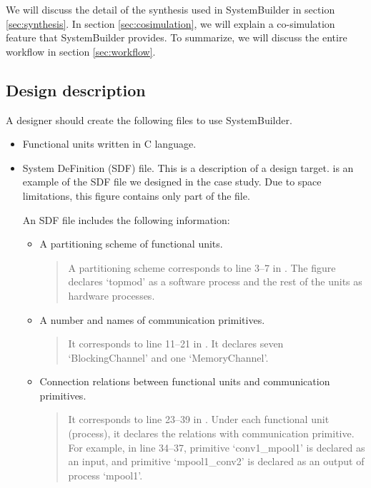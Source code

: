 We will discuss the detail of the synthesis used in SystemBuilder in section \ref{sec:synthesis}. In section \ref{sec:cosimulation}, we will explain a co-simulation feature that SystemBuilder provides.
 To summarize, we will discuss the entire workflow in section \ref{sec:workflow}.

\subsection{Design description} \label{sec:design_description}
A designer should create the following files to use SystemBuilder.
\begin{itemize}
  \item Functional units written in C language.  %
  \item System DeFinition (SDF) file. This is a description of a design target.  is an example of the SDF file we designed in the case study. Due to space limitations, this figure contains only part of the file.

    An SDF file includes the following information:
    \begin{itemize}
  \item A partitioning scheme of functional units.
    \begin{quote}
      A partitioning scheme corresponds to line 3--7 in . The figure declares `topmod' as a software process and the rest of the units as hardware processes.
    \end{quote}
  \item A number and names of communication primitives.
    \begin{quote}
      It corresponds to line 11--21 in . It declares seven `BlockingChannel' and one `MemoryChannel'.
    \end{quote}
  \item Connection relations between functional units and communication primitives.
    \begin{quote}
        It corresponds to line 23--39 in . Under each functional unit (process), it declares the relations with communication primitive. For example, in line 34--37, primitive `conv1\_mpool1' is declared as an input, and primitive `mpool1\_conv2' is declared as an output of process `mpool1'.
    \end{quote}
    \end{itemize}
\end{itemize}

